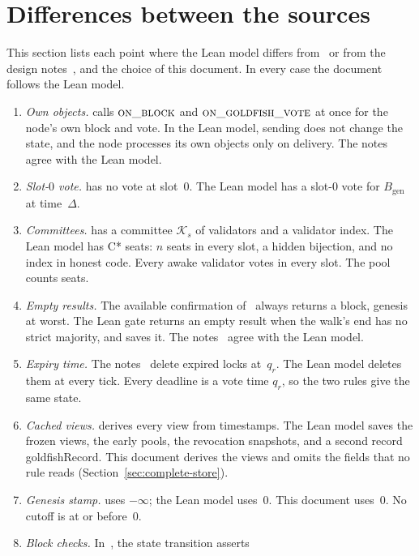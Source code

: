 \documentclass{article}
\theoremstyle{plain}
\theoremstyle{definition}
\theoremstyle{remark}
\newcommand{\genesis}{B_{\mathrm{gen}}}
\newcommand{\DC}[1]{\cite[\S#1]{DC}}
\newcommand{\lean}[1]{\textsf{#1}}
\begin{document}
\section{Differences between the sources}\label{sec:differences}

This section lists each point where the Lean model differs from~\cite{DC}
or from the design notes~\cite{SA,RT}, and the choice of this document.
In every case the document follows the Lean model.

\begin{enumerate}[leftmargin=*]
\item \emph{Own objects.}  \cite{DC} calls $\Call{on\_block}{}$ and
  $\Call{on\_goldfish\_vote}{}$ at once for the node's own block and
  vote.  In the Lean model, sending does not change the state, and the
  node processes its own objects only on delivery.  The notes~\cite{SA}
  agree with the Lean model.
\item \emph{Slot-$0$ vote.}  \cite{DC} has no vote at slot~$0$.  The
  Lean model has a slot-$0$ vote for $\genesis$ at time~$\Delta$.
\item \emph{Committees.}  \cite{DC} has a committee $\mathcal K_s$ of
  validators and a validator index.  The Lean model has C* seats: $n$
  seats in every slot, a hidden bijection, and no index in honest code.
  Every awake validator votes in every slot.  The pool counts seats.
\item \emph{Empty results.}  The available confirmation of~\DC{2.6}
  always returns a block, genesis at worst.  The Lean gate returns an
  empty result when the walk's end has no strict majority, and saves it.
  The notes~\cite{SA} agree with the Lean model.
\item \emph{Expiry time.}  The notes~\cite[\S3]{SA} delete expired locks
  at~$q_r$.  The Lean model deletes them at every tick.  Every deadline
  is a vote time $q_r$, so the two rules give the same state.
\item \emph{Cached views.}  \cite{DC} derives every view from
  timestamps.  The Lean model saves the frozen views, the early pools,
  the revocation snapshots, and a second record \lean{goldfishRecord}.
  This document derives the views and omits the fields that no rule
  reads (Section~\ref{sec:complete-store}).
\item \emph{Genesis stamp.}  \cite{DC} uses $-\infty$; the Lean model
  uses~$0$.  This document uses~$0$.  No cutoff is at or before~$0$.
\item \emph{Block checks.}  In~\cite{DC}, the state transition asserts

\end{enumerate}
\end{document}
